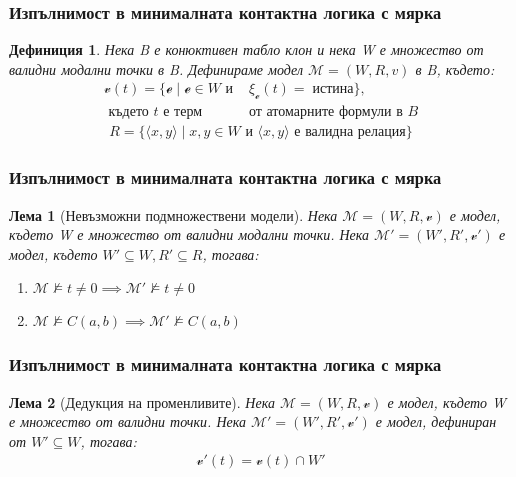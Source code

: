 \documentclass{beamer}
\newtheorem{defn}{Дефиниция}[section]
\newtheorem{lema}{Лема}[section]
\newcommand{\curvedE}{\mathscr{e}}
\newcommand{\vE}{\mathscr{v}}
\newcommand{\vBool}{\xi}
\begin{document}
\begin{frame}\frametitle{Изпълнимост в минималната контактна логика с мярка}
	\begin{defn}
Нека B е конюктивен табло клон и нека W е множество от валидни модални точки в B. Дефинираме модел $\mathcal{M} = (W, R, v)$ в B, където:
		\begin{align*}
				\vE(t) = \{ \curvedE \; | \; \curvedE \in W \textit{ и } &\vBool_{\curvedE}(t) =\; \textit{истина} \}, \\
				\textit{ където t е терм } & \textit{от атомарните формули в B}
		\end{align*}
		\begin{align*}
				R = \{ \langle x, y \rangle\; | \; x, y \in W \textit{ и } \langle x, y \rangle \textit{ е валидна релация}\}
		\end{align*}
	\end{defn}
\end{frame}

\begin{frame}\frametitle{Изпълнимост в минималната контактна логика с мярка}
\begin{lema}[Невъзможни подмножествени модели]
Нека $\mathcal{M} = (W, R, \vE)$ е модел, където W е множество от валидни модални точки.
Нека $\mathcal{M'} = (W', R', \vE')$ е модел, където $W' \subseteq W, R' \subseteq R$, тогава:
	\begin{enumerate}
		\item $\mathcal{M} \not\models t \neq 0 \implies \mathcal{M'} \not\models t \neq 0$
		\item $\mathcal{M} \not\models C(a,b) \implies \mathcal{M'} \not\models C(a,b)$
	\end{enumerate}
	\end{lema}
\end{frame}

\begin{frame}\frametitle{Изпълнимост в минималната контактна логика с мярка}
	\begin{lema}[Дедукция на променливите]
		Нека $\mathcal{M} = (W, R, \vE)$ е модел, където W е множество от валидни точки.
		Нека $\mathcal{M'} = (W', R', \vE')$ е модел, дефиниран от $W' \subseteq W$, тогава:
		\begin{align*}
			\vE'(t) =  \vE(t) \cap W'
		\end{align*}
	\end{lema}
\end{frame}
\end{document}
